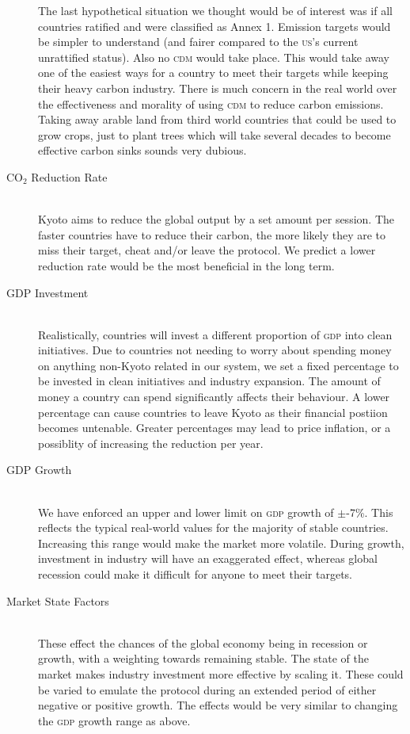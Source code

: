 \begin{description}
The last hypothetical situation we thought would be of interest was if all countries ratified and were classified as Annex 1. Emission targets would be simpler to understand (and fairer compared to the \textsc{us}'s current unrattified status). Also no \textsc{cdm} would take place. This would take away one of the easiest ways for a country to meet their targets while keeping their heavy carbon industry. There is much concern in the real world over the effectiveness and morality of using \textsc{cdm} to reduce carbon emissions. Taking away arable land from third world countries that could be used to grow crops, just to plant trees which will take several decades to become effective carbon sinks sounds very dubious.

\item[CO$_2$ Reduction Rate] \hfill \\

Kyoto aims to reduce the global \CO output by a set amount per session. The faster countries have to reduce their carbon, the more likely they are to miss their target, cheat and/or leave the protocol. We predict a lower reduction rate would be the most beneficial in the long term.


\item[GDP Investment] \hfill \\

Realistically, countries will invest a different proportion of \textsc{gdp} into clean initiatives. Due to countries not needing to worry about spending money on anything non-Kyoto related in our system, we set a fixed percentage to be invested in clean initiatives and industry expansion.   The amount of money a country can spend significantly affects their behaviour.  A lower percentage can cause countries to leave Kyoto as their financial postiion becomes untenable.  Greater percentages may lead to price inflation, or a possiblity of increasing the reduction per year.

\item[GDP Growth] \hfill \\

We have enforced an upper and lower limit on \textsc{gdp} growth of $\pm$-7\%. This reflects the typical real-world values for the majority of stable countries. Increasing this range would make the market more volatile. During growth, investment in industry will have an exaggerated effect, whereas global recession could make it difficult for anyone to meet their targets.

\item[Market State Factors] \hfill \\

These effect the chances of the global economy being in recession or growth, with a weighting towards remaining stable. The state of the market makes industry investment more effective by scaling it.  These could be varied to emulate the protocol during an extended period of either negative or positive growth. The effects would be very similar to changing the \textsc{gdp} growth range as above.
\end{description}

